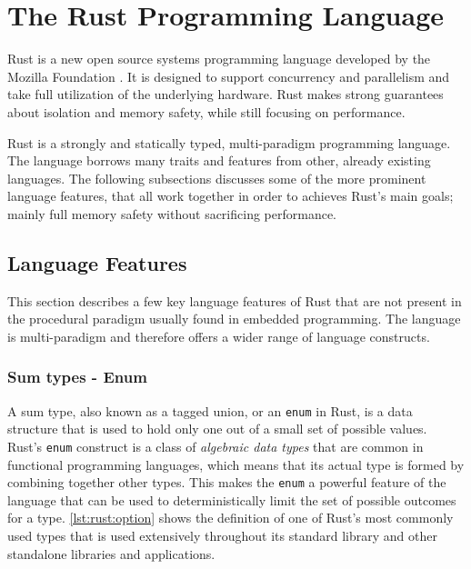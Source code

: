 
\section{The Rust Programming Language} %
\label{sub:the_rust_programming_language}

Rust \cite{web:rust_lang} is a new open source systems programming language developed by the Mozilla Foundation \cite{web:mozilla_foundation}.
It is designed to support concurrency and parallelism and take full utilization of the underlying hardware.
Rust makes strong guarantees about isolation and memory safety, while still focusing on performance.

Rust is a strongly and statically typed, multi-paradigm programming language.
The language borrows many traits and features from other, already existing languages.
The following subsections discusses some of the more prominent language features, that all work together in order to achieves Rust's main goals; mainly full memory safety without sacrificing performance.

\subsection{Language Features}
\label{ssub:rust:features}

This section describes a few key language features of Rust that are not present in the procedural paradigm usually found in embedded programming.
The language is multi-paradigm and therefore offers a wider range of language constructs.

\subsubsection{Sum types - Enum}

A sum type, also known as a tagged union, or an \texttt{enum} in Rust, is a data structure that is used to hold only one out of a small set of possible values.
Rust's \texttt{enum} construct is a class of \emph{algebraic data types} that are common in functional programming languages, which means that its actual type is formed by combining together other types.
This makes the \texttt{enum} a powerful feature of the language that can be used to deterministically limit the set of possible outcomes for a type.
\autoref{lst:rust:option} shows the definition of one of Rust's most commonly used types that is used extensively throughout its standard library and other standalone libraries and applications.

